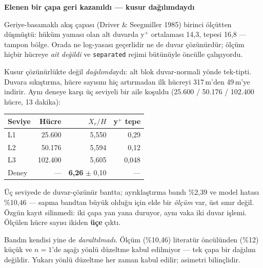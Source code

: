 \documentclass[11pt,a4paper]{article}
\newcommand{\kkkenar}{lacivert}
\newcommand{\kkzemin}{kod}
\newenvironment{renkkutu}[3]{%
  \renewcommand{\kkkenar}{#1}\renewcommand{\kkzemin}{#2}%
  \par\medskip\noindent
  \begin{lrbox}{\kutugovde}%
  \begin{minipage}{\dimexpr\linewidth-2\fboxsep-2\fboxrule\relax}\footnotesize
  \textcolor{#1}{\textbf{#3}}\par\vspace{3pt}%
}{%
  \end{minipage}%
  \end{lrbox}%
  \noindent\fcolorbox{\kkkenar}{\kkzemin}{\usebox{\kutugovde}}%
  \par\medskip
}
\newenvironment{olculdu}[1]{\begin{renkkutu}{iyi}{iyibg}{#1}}{\end{renkkutu}}
\begin{document}
\begin{olculdu}{Elenen bir çapa geri kazanıldı --- kusur dağılımdaydı}
Geriye-basamaklı akış çapası (Driver \& Seegmiller 1985) birinci ölçütten
düşmüştü: hüküm yaması olan alt duvarda y$^+$ ortalaması 14{,}3, tepesi
16{,}8 --- tampon bölge. Orada ne log-yasası geçerlidir ne de duvar
çözünürdür; ölçüm hiçbir hücreye \emph{ait değildi} ve \texttt{separated}
rejimi bütünüyle öncülle çalışıyordu.

Kusur çözünürlükte değil \emph{dağılımda}ydı: alt blok duvar-normali yönde
tek-tipti. Duvara sıkıştırma, hücre sayısını hiç artırmadan ilk hücreyi
317\,\textmu m'den 49\,\textmu m'ye indirir. Aynı deneye karşı üç seviyeli bir
aile koşuldu (25.600 / 50.176 / 102.400 hücre, 13 dakika):

\begin{center}\footnotesize
\begin{tabular}{@{}lrrr@{}}
\toprule
\textbf{Seviye} & \textbf{Hücre} & \textbf{$X_r/H$} & \textbf{y$^+$ tepe} \\
\midrule
L1 & 25.600 & 5{,}550 & 0{,}29 \\
L2 & 50.176 & 5{,}594 & 0{,}12 \\
L3 & 102.400 & 5{,}605 & 0{,}048 \\
\midrule
Deney & --- & \textbf{6{,}26} $\pm$ 0{,}10 & --- \\
\bottomrule
\end{tabular}
\end{center}

\noindent Üç seviyede de duvar-çözünür bantta; ayrıklaştırma bandı \%2{,}39 ve
model hatası \%10{,}46 --- sapma bandtan büyük olduğu için elde bir
\emph{ölçüm} var, üst sınır değil. Özgün kayıt silinmedi: iki çapa yan yana
duruyor, aynı vaka iki duvar işlemi. Ölçülen hücre sayısı ikiden \textbf{üçe}
çıktı.

Bandın kendisi yine de \emph{daraltılmadı}. Ölçüm (\%10{,}46) literatür
öncülünden (\%12) küçük ve $n{=}1$'de aşağı yönlü düzeltme kabul edilmiyor ---
tek çapa bir dağılım değildir. Yukarı yönlü düzeltme her zaman kabul edilir;
asimetri bilinçlidir.
\end{olculdu}
\end{document}
